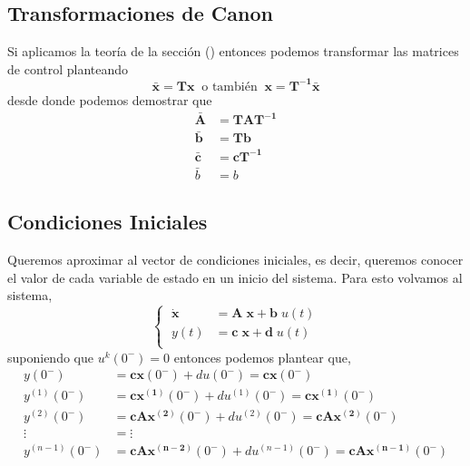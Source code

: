 \subsection{Transformaciones de Canon}
Si aplicamos la teoría de la sección () entonces podemos transformar
las matrices de control planteando
\begin{equation*}
    \bm{\bar{x}} = \bm{T} \bm{x} \; \; \text{o también} \; \;\bm{x} = \bm{T^{-1}} \bm{\bar{x}}
\end{equation*}
desde donde podemos demostrar que
\begin{equation*}
    \begin{split}
        \bm{\bar{A}} &= \bm{T} \bm{A} \bm{T^{-1}} \\
        \bm{\bar{b}} &= \bm{T} \bm{b} \\
        \bm{\bar{c}} &= \bm{c} \bm{T^{-1}} \\
        \bar{b} &= b
    \end{split}
\end{equation*}

\subsection{Condiciones Iniciales}
Queremos aproximar al vector de condiciones iniciales, es decir, queremos
conocer el valor de cada variable de estado en un inicio del sistema.
Para esto volvamos al sistema,
\begin{equation*}
    \begin{cases}
        \; \dot{\bm{x}} &= \bm{A} \; \bm{x} + \bm{b} \; u(t) \\
        \; y(t) &= \bm{c} \;\bm{x} + \bm{d} \; u(t) \\
    \end{cases}%
\end{equation*}
suponiendo que \( u^{k}(0^{-})=0 \) entonces podemos plantear que,
\begin{equation*}
    \begin{split}
        y(0^{-}) &= \bm{c} \bm{x}(0^{-}) + d u(0^{-}) = \bm{c} \bm{x}(0^{-}) \\
        y^{(1)}(0^{-}) &= \bm{c} \bm{x^{(1)}}(0^{-}) + d u^{(1)}(0^{-}) = \bm{c} \bm{x^{(1)}}(0^{-}) \\
        y^{(2)}(0^{-}) &= \bm{c} \bm{A} \bm{x^{(2)}}(0^{-}) + d u^{(2)}(0^{-}) = \bm{c} \bm{A} \bm{x^{(2)}}(0^{-}) \\
        \vdots &= \vdots \\
        y^{(n-1)}(0^{-}) &= \bm{c} \bm{A} \bm{x^{(n-2)}}(0^{-}) + d u^{(n-1)}(0^{-}) = \bm{c} \bm{A} \bm{x^{(n-1)}}(0^{-}) \\
    \end{split}
\end{equation*}












